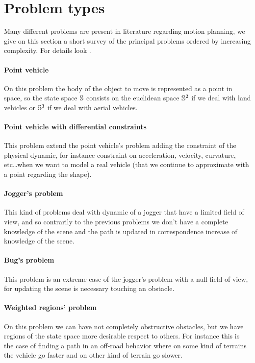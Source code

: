 \documentclass[dissertation.tex]{subfiles}
\begin{document}
\section{Problem types}
Many different problems are present in literature regarding motion
planning, we give on this section a short survey of the principal
problems ordered by increasing complexity. For details look
\cite{goerzen}.

\paragraph{Point vehicle}
On this problem the body of the object to move is represented as a
point in space, so the state space $\mathbb{S}$ consists on the euclidean
space $\mathbb{S}^2$ if we deal with land vehicles or $\mathbb{S}^3$ if we deal with
aerial vehicles.

\paragraph{Point vehicle with differential constraints}
This problem extend the point vehicle's problem adding the
constraint of the physical dynamic, for instance constraint on
acceleration, velocity, curvature, etc\dots when we want to model a
real vehicle (that we continue to approximate with a point regarding
the shape).

\paragraph{Jogger's problem}
This kind of problems deal with dynamic of a jogger that have a
limited field of view, and so contrarily to the previous problems we
don't have a complete knowledge of the scene and the path is
updated in correspondence increase of knowledge of the scene.

\paragraph{Bug's problem}
This problem is an extreme case of the jogger's problem with a null
field of view, for updating the scene is necessary touching an
obstacle.

\paragraph{Weighted regions' problem}
On this problem we can have not completely obstructive obstacles, but
we have regions of the state space more desirable respect to
others. For instance this is the case of finding a path in an off-road
behavior where on some kind of terrains the vehicle go faster and on
other kind of terrain go slower.
\end{document}
